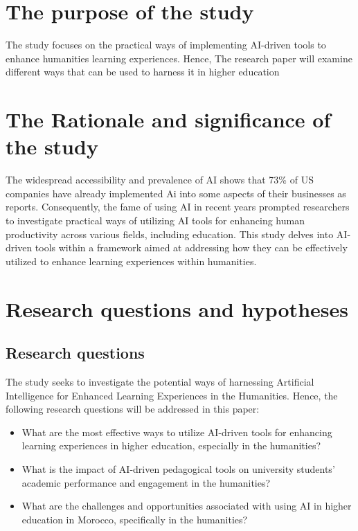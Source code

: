 \section{The purpose of the study}\label{sec:the-purpose-of-the-study}
\justifying
The study focuses on the practical ways of implementing AI-driven tools to enhance humanities learning experiences.
Hence, The research paper will examine different ways that can be used to harness it in higher education


\section{The Rationale and significance of the study}\label{sec:the-rationale-and-significance-of-the-study}
\justifying
The widespread accessibility and prevalence of AI shows that 73\% of US companies have already
implemented Ai into some aspects of their businesses as \textcite{pricewaterhousecoopers} reports.
Consequently, the fame of using AI in recent years prompted researchers to investigate practical
ways of utilizing AI tools for enhancing human productivity across various fields,
including education. This study
delves into AI-driven tools within a framework aimed at addressing
how they can be effectively utilized to enhance learning experiences within humanities.


\section{Research questions and hypotheses}\label{sec:research-questions-and-hypotheses}

\subsection{Research questions}\label{subsec:research-questions}
\justifying
The study seeks to investigate the potential ways
of harnessing Artificial Intelligence for
Enhanced Learning Experiences in the Humanities.
Hence,
the following research questions will be addressed in this paper:
\begin{itemize}
      \item What are the most effective ways to utilize AI-driven
            tools for enhancing learning experiences in higher education,
            especially in the humanities?
      \item What is the impact of AI-driven pedagogical tools
            on university students' academic performance
            and engagement in the humanities?
      \item What are the challenges and opportunities associated
            with using AI in higher education in Morocco,
            specifically in the humanities?
\end{itemize}
